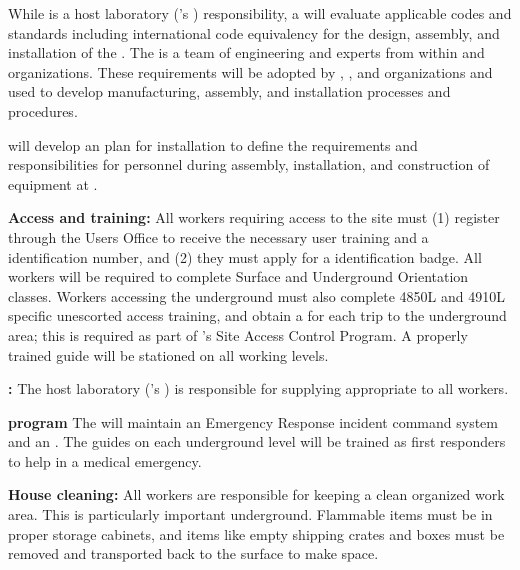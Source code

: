 While  is  a host laboratory ('s ) responsibility, a   will evaluate applicable codes and standards including international code equivalency for the design, assembly, and installation of the  . The  is  a team of engineering and  experts from within  and  organizations.  These requirements will be adopted by , , and  organizations and used to develop manufacturing, assembly, and installation processes and procedures. 

 will develop an %
 plan for  installation to define %
the  requirements and responsibilities for personnel during  assembly, installation, and construction of equipment  at . %

{\bf Access and training:}  All  workers requiring access to the  site must (1) register through the  Users Office to receive the necessary user training and a  identification number, and (2) they must apply for a  identification badge. 
All  workers will be required to complete  Surface and Underground Orientation classes. Workers accessing the underground must also complete 4850L and 4910L specific unescorted access training, and obtain a  for each trip to the underground area; this is required as part of 's Site Access Control Program. 
A properly trained guide will be stationed on all working levels. 

{\bf {}:} 
The host laboratory ('s ) is responsible for supplying appropriate  to all workers. 

{\bf {} program} The  will maintain an Emergency Response incident command system and an .  The guides on each underground level will be trained as first responders to help in a medical emergency.
  
  
  {\bf House cleaning:} All workers are responsible for keeping a clean organized work area. This is particularly important underground. Flammable items must be in proper storage cabinets, and items like empty shipping crates and boxes must be removed and 
transported back to the surface to make space.


